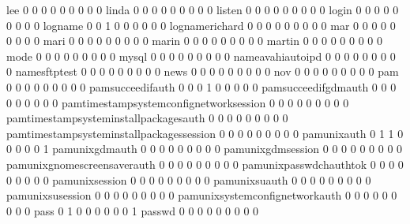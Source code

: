 \documentclass[compress,8pt]{beamer}
\begin{document}
\begin{frame}
\begin{Schunk}
  lee                                        0   0   0   0   0   0   0   0   0
  linda                                      0   0   0   0   0   0   0   0   0
  listen                                     0   0   0   0   0   0   0   0   0
  login                                      0   0   0   0   0   0   0   0   0
  logname                                    0   0   1   0   0   0   0   0   0
  lognamerichard                             0   0   0   0   0   0   0   0   0
  mar                                        0   0   0   0   0   0   0   0   0
  mari                                       0   0   0   0   0   0   0   0   0
  marin                                      0   0   0   0   0   0   0   0   0
  martin                                     0   0   0   0   0   0   0   0   0
  mode                                       0   0   0   0   0   0   0   0   0
  mysql                                      0   0   0   0   0   0   0   0   0
  nameavahiautoipd                           0   0   0   0   0   0   0   0   0
  namesftptest                               0   0   0   0   0   0   0   0   0
  news                                       0   0   0   0   0   0   0   0   0
  nov                                        0   0   0   0   0   0   0   0   0
  pam                                        0   0   0   0   0   0   0   0   0
  pamsucceedifauth                           0   0   0   1   0   0   0   0   0
  pamsucceedifgdmauth                        0   0   0   0   0   0   0   0   0
  pamtimestampsystemconfignetworksession     0   0   0   0   0   0   0   0   0
  pamtimestampsysteminstallpackagesauth      0   0   0   0   0   0   0   0   0
  pamtimestampsysteminstallpackagessession   0   0   0   0   0   0   0   0   0
  pamunixauth                                0   1   1   0   0   0   0   0   1
  pamunixgdmauth                             0   0   0   0   0   0   0   0   0
  pamunixgdmsession                          0   0   0   0   0   0   0   0   0
  pamunixgnomescreensaverauth                0   0   0   0   0   0   0   0   0
  pamunixpasswdchauthtok                     0   0   0   0   0   0   0   0   0
  pamunixsession                             0   0   0   0   0   0   0   0   0
  pamunixsuauth                              0   0   0   0   0   0   0   0   0
  pamunixsusession                           0   0   0   0   0   0   0   0   0
  pamunixsystemconfignetworkauth             0   0   0   0   0   0   0   0   0
  pass                                       0   1   0   0   0   0   0   0   1
  passwd                                     0   0   0   0   0   0   0   0   0

\end{Schunk}
\end{frame}
\end{document}
